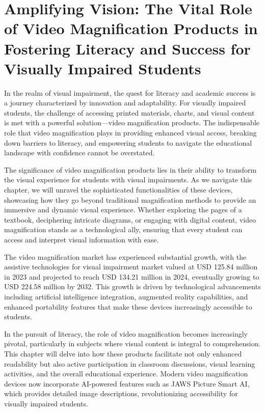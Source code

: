 \chapter{Amplifying Vision: The Vital Role of Video Magnification Products in Fostering Literacy and Success for Visually Impaired Students}\label{low-vision}

In the realm of visual impairment, the quest for literacy and academic success is a journey characterized by innovation and adaptability. For visually impaired students, the challenge of accessing printed materials, charts, and visual content is met with a powerful solution—video magnification products. The indispensable role that video magnification plays in providing enhanced visual access, breaking down barriers to literacy, and empowering students to navigate the educational landscape with confidence cannot be overstated.

The significance of video magnification products lies in their ability to transform the visual experience for students with visual impairments. As we navigate this chapter, we will unravel the sophisticated functionalities of these devices, showcasing how they go beyond traditional magnification methods to provide an immersive and dynamic visual experience. Whether exploring the pages of a textbook, deciphering intricate diagrams, or engaging with digital content, video magnification stands as a technological ally, ensuring that every student can access and interpret visual information with ease.

The video magnification market has experienced substantial growth, with the assistive technologies for visual impairment market valued at USD 125.84 million in 2023 and projected to reach USD 134.21 million in 2024, eventually growing to USD 224.58 million by 2032. This growth is driven by technological advancements including artificial intelligence integration, augmented reality capabilities, and enhanced portability features that make these devices increasingly accessible to students.

In the pursuit of literacy, the role of video magnification becomes increasingly pivotal, particularly in subjects where visual content is integral to comprehension. This chapter will delve into how these products facilitate not only enhanced readability but also active participation in classroom discussions, visual learning activities, and the overall educational experience. Modern video magnification devices now incorporate AI-powered features such as JAWS Picture Smart AI, which provides detailed image descriptions, revolutionizing accessibility for visually impaired students.


